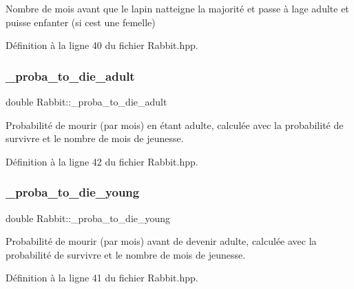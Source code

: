 Nombre de mois avant que le lapin n\textquotesingle{}atteigne la majorité et passe à l\textquotesingle{}age adulte et puisse enfanter (si c\textquotesingle{}est une femelle) 



Définition à la ligne 40 du fichier Rabbit.\+hpp.

\mbox{\label{classRabbit_a600d8595c407b95965497f7308d72ab1}} 
\subsubsection{\texorpdfstring{\+\_\+proba\+\_\+to\+\_\+die\+\_\+adult}{\_proba\_to\_die\_adult}}
{\footnotesize\ttfamily double Rabbit\+::\+\_\+proba\+\_\+to\+\_\+die\+\_\+adult\hspace{0.3cm}{\ttfamily [protected]}}



Probabilité de mourir (par mois) en étant adulte, calculée avec la probabilité de survivre et le nombre de mois de jeunesse. 



Définition à la ligne 42 du fichier Rabbit.\+hpp.

\mbox{\label{classRabbit_a622452eedf7ef0addf1e2ce3d8ef34dc}} 
\subsubsection{\texorpdfstring{\+\_\+proba\+\_\+to\+\_\+die\+\_\+young}{\_proba\_to\_die\_young}}
{\footnotesize\ttfamily double Rabbit\+::\+\_\+proba\+\_\+to\+\_\+die\+\_\+young\hspace{0.3cm}{\ttfamily [protected]}}



Probabilité de mourir (par mois) avant de devenir adulte, calculée avec la probabilité de survivre et le nombre de mois de jeunesse. 



Définition à la ligne 41 du fichier Rabbit.\+hpp.

